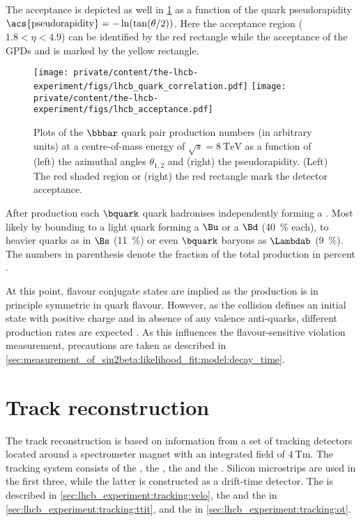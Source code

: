 The acceptance is depicted as well in
\cref{fig:lhcb_experiment:detector:production} as a function of the quark
\acl{pseudorapidity} $\text{\acs{pseudorapidity}} = -\ln(\tan(\theta/2))$. Here
the \LHCb acceptance region ($\num{1.8} < \eta < \num{4.9}$) can be identified
by the red rectangle while the acceptance of the \acfp{GPD} \ATLAS and \CMS is
marked by the yellow rectangle.
%
\begin{figure}[t]
  \centering
    \texttt{[image: private/content/the-lhcb-experiment/figs/lhcb\_quark\_correlation.pdf]}
    \texttt{[image: private/content/the-lhcb-experiment/figs/lhcb\_acceptance.pdf]}
  \caption{
    Plots of the $\bbbar$ quark pair production numbers (in arbitrary units) at
  a centre-of-mass energy of $\sqrt{s} = \SI{8}{\TeV}$ as a function of (left)
  the azimuthal angles $\theta_{1,2}$ and (right) the \acf{pseudorapidity}.
  (Left) The red shaded region or (right) the red rectangle mark the \LHCb
  detector acceptance. \cite{lhcb:quarkproduction}}
  \label{fig:lhcb_experiment:detector:production}
\end{figure}
%

After production each $\bquark$ quark hadronises independently forming a
\bhadron. Most likely by bounding to a light quark forming a $\Bu$ or a $\Bd$
(\SI{40}{\percent} each), to heavier quarks as in $\Bs$ (\SI{11}{\percent}) or
even $\bquark$ baryons as $\Lambdab$ (\SI{9}{\percent}). The numbers in
parenthesis denote the fraction of the total production in percent
\cite{Agashe:2014kda}. 

At this point, flavour conjugate states are implied as the production is in
principle symmetric in quark flavour. However, as the
\protonproton collision defines an initial state with positive charge and in
absence of any valence anti-quarks, different production rates are expected
\cite{Chaichian:1993rh,Norrbin:2000zc,Norrbin:2000jy}. As this influences the
flavour-sensitive \CP violation measurement, precautions are taken as described
in \cref{sec:measurement_of_sin2beta:likelihood_fit:model:decay_time}.

\section{Track reconstruction}
\label{sec:lhcb_experiment:tracking}

The \LHCb track reconstruction is based on information from a set of tracking
detectors located around a spectrometer magnet with an integrated field of
$\SI{4}{\tesla\metre}$. The tracking system consists of the \VELO, the \TT, the
\IT and the \OT. Silicon microstrips are used in the first three, while the
latter is constructed as a drift-time detector. The \VELO is described in
\cref{sec:lhcb_experiment:tracking:velo}, the \TT and the \IT in
\cref{sec:lhcb_experiment:tracking:ttit}, and the \OT in
\cref{sec:lhcb_experiment:tracking:ot}.

